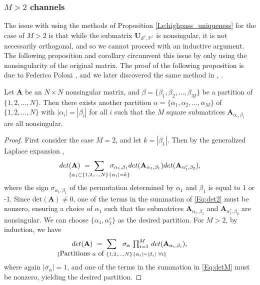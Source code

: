 \documentclass[journal, 10pt]{IEEEtran}
\begin{document}
\subsubsection{$M>2$ channels}
The issue with using the methods of Proposition \ref{Le:highpass_uniqueness} for the case of $M>2$ is that while the submatrix ${\mathbf{U}}_{{\mathcal S^c},{\mathcal T^c}}$ is nonsingular, it is not necessarily orthogonal, and so we cannot proceed with an inductive argument. The following proposition and corollary circumvent this issue by only using the nonsingularity of the original matrix. The proof of the following proposition is due to Federico Poloni \cite{poloni}, %
and we later discovered the same method in \cite{greeneMultiple}, \cite[Theorem 3.3]{greene_magnanti}.
\begin{proposition}\label{Pr:mat_part}
Let $\mathbf{A}$ be an $N \times N$ nonsingular matrix, and $\beta=\{\beta_1,\beta_2,\ldots,\beta_M\}$ be a partition of $\{1,2,\ldots,N\}$. Then there exists another partition $\alpha=\{\alpha_1,\alpha_2,\ldots,\alpha_M\}$ of $\{1,2,\ldots,N\}$ with $|\alpha_i|=|\beta_i|$ for all $i$ such that the $M$ square submatrices $\mathbf{A}_{\alpha_i,\beta_i}$ are all nonsingular.
\end{proposition}
\begin{proof}%
First consider the case $M=2$, and let $k=|\beta_1|$. Then by the generalized Laplace expansion \cite{gle}, 
\begin{align}\label{Eq:det2}
\mbox{det}(\mathbf{A})~=~\sum_{\mathclap{\{\alpha_1 \subset \{1,2,\ldots,N\}: |\alpha_1|=k \}}}~~\sigma_{\alpha_1,\beta_1} \mbox{det}(\mathbf{A}_{\alpha_1,\beta_1})\mbox{det}(\mathbf{A}_{\alpha_1^c,\beta_2}),
\end{align}
where the sign $\sigma_{\alpha_1,\beta_1}$ of the permutation determined by $\alpha_1$ and $\beta_1$ is equal to 1 or -1. Since $\mbox{det}(\mathbf{A})\neq 0$, one of the terms in the summation of \eqref{Eq:det2} must be nonzero, ensuring a choice of $\alpha_1$ such that the submatrices $\mathbf{A}_{\alpha_1,\beta_1}$ and $\mathbf{A}_{\alpha_1^c,\beta_2}$ are nonsingular. We can choose $\{\alpha_1,\alpha_1^c\}$ as the desired partition. For $M>2$, by induction, we have
\begin{align}\label{Eq:detM}
\mbox{det}(\mathbf{A})~=~\sum_{\mathclap{\{\hbox{Partitions } \alpha \hbox{ of }\{1,2,\ldots,N\}: |\alpha_i|=|\beta_i|~\forall i \}}}~~\sigma_{\alpha}~{\textstyle \prod_{i=1}^M}~\mbox{det}(\mathbf{A}_{\alpha_i,\beta_i}),
\end{align}
where again $|\sigma_\alpha|=1$, %
and one of the terms in the summation in \eqref{Eq:detM} must be nonzero, yielding the desired partition. 
\end{proof}
\end{document}
